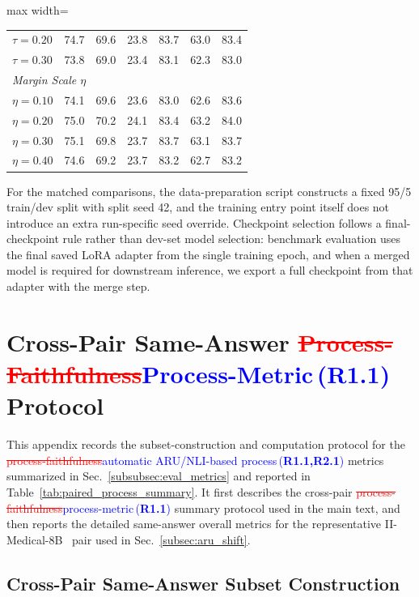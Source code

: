\documentclass[a4paper,fleqn,doubleblind]{cas-sc}
\DeclareRobustCommand{\deleted}[1]{\textcolor{red}{\sout{#1}}}
\DeclareRobustCommand{\added}[1]{\textcolor{blue}{#1}}
\DeclareRobustCommand{\revtag}[1]{\textcolor{blue}{\scriptsize\,(\textbf{#1})}}
\begin{document}
\begin{table}[htbp]
\begin{adjustbox}{max width=\textwidth}
\begin{tabular}{lcccccc}
        \quad $\tau=0.20$ & 74.7 & 69.6 & 23.8 & 83.7 & 63.0 & 83.4 \\
        \quad $\tau=0.30$ & 73.8 & 69.0 & 23.4 & 83.1 & 62.3 & 83.0 \\
        \midrule
        \multicolumn{7}{l}{\textit{Margin Scale $\eta$}} \\
        \quad $\eta=0.10$ & 74.1 & 69.6 & 23.6 & 83.0 & 62.6 & 83.6 \\
        \quad $\eta=0.20$ & 75.0 & 70.2 & 24.1 & 83.4 & 63.2 & 84.0 \\
        \quad $\eta=0.30$ & 75.1 & 69.8 & 23.7 & 83.7 & 63.1 & 83.7 \\
        \quad $\eta=0.40$ & 74.6 & 69.2 & 23.7 & 83.2 & 62.7 & 83.2 \\
        \bottomrule
    \end{tabular}
    \end{adjustbox}
\end{table}

For the matched comparisons, the data-preparation script constructs a fixed 95/5 train/dev split with split seed 42, and the training entry point itself does not introduce an extra run-specific seed override. Checkpoint selection follows a final-checkpoint rule rather than dev-set model selection: benchmark evaluation uses the final saved LoRA adapter from the single training epoch, and when a merged model is required for downstream inference, we export a full checkpoint from that adapter with the merge step.

\section{Cross-Pair Same-Answer \deleted{Process-Faithfulness}\added{Process-Metric}\revtag{R1.1} Protocol}
\label{app:process_metrics}

This appendix records the subset-construction and computation protocol for the \deleted{process-faithfulness}\added{automatic ARU/NLI-based process}\revtag{R1.1,R2.1} metrics summarized in Sec.~\ref{subsubsec:eval_metrics} and reported in Table~\ref{tab:paired_process_summary}. It first describes the cross-pair \deleted{process-faithfulness}\added{process-metric}\revtag{R1.1} summary protocol used in the main text, and then reports the detailed same-answer overall metrics for the representative II-Medical-8B~\cite{intelligentinternet2025iimedical8b} pair used in Sec.~\ref{subsec:aru_shift}.

\subsection{Cross-Pair Same-Answer Subset Construction}
\end{document}
